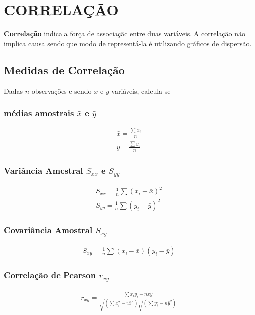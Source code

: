 \documentclass[12pt,a4paper]{book}
\begin{document}
	
	
	
	\fancyhead[OR,EL]{\thepage}
	\setcounter{page}{1}
	

	
	\chapter{CORRELAÇÃO}
	
		\textbf{Correlação} indica a força de associação entre duas variáveis. A correlação não implica causa sendo que modo de representá-la é utilizando gráficos de dispersão.
	
		\section{Medidas de Correlação}
				Dadas $n$ observações e sendo $ x $ e $ y $ variáveis, calcula-se
				\subsection{ médias amostrais $\bar{x}$ e $\bar{y}$}
				
				\begin{eqnarray}
					\bar{x} = \frac{\sum x_i}{n} \\
					\bar{y} = \frac{\sum y_i}{n}
				\end{eqnarray}
			
				\subsection{Variância Amostral $S_{xx}$ e $S_{yy}$}
				
				\begin{eqnarray}
					S_{xx} = \frac{1}{n}\sum(x_i - \bar{x})^2 \\
					S_{yy} = \frac{1}{n}\sum(y_i - \bar{y})^2
				\end{eqnarray}
			
				\subsection{Covariância Amostral $S_{xy}$}
				
				\begin{eqnarray}
					S_{xy} = \frac{1}{n}\sum(x_i - \bar{x})(y_i - \bar{y})
				\end{eqnarray}
				
				\subsection{Correlação de Pearson $r_{xy}$}
				\begin{eqnarray}
					r_{xy} = \frac{\sum x_i y_i - n\bar{x}\bar{y}}{\sqrt{(\sum x_{i}^2 - n\bar{x}^2)}\sqrt{(\sum y_{i}^2 - n\bar{y}^2)}}
				\end{eqnarray}
				
	
	
	\newpage 
	\centering
	

	
\end{document}
